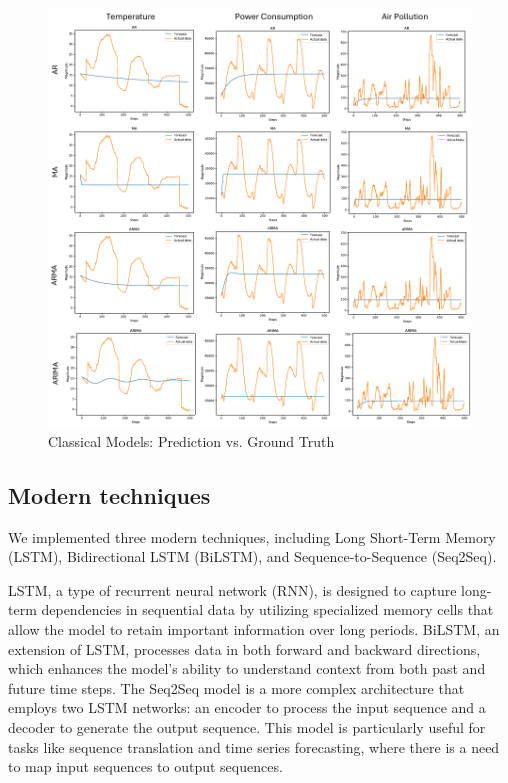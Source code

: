 \documentclass{scrartcl}
\begin{document}
\begin{figure}[]
	\begin{center}
		\includegraphics[scale=0.9]{Latex_report/fig/classical.pdf}
	\end{center}
	\caption{Classical Models: Prediction vs. Ground Truth}
	\label{fig:classical}
\end{figure}


\subsection{Modern techniques}
We implemented three modern techniques, including Long Short-Term Memory (LSTM), Bidirectional LSTM (BiLSTM), and Sequence-to-Sequence (Seq2Seq).


LSTM, a type of recurrent neural network (RNN), is designed to capture long-term dependencies in sequential data by utilizing specialized memory cells that allow the model to retain important information over long periods. BiLSTM, an extension of LSTM, processes data in both forward and backward directions, which enhances the model’s ability to understand context from both past and future time steps. The Seq2Seq model is a more complex architecture that employs two LSTM networks: an encoder to process the input sequence and a decoder to generate the output sequence. This model is particularly useful for tasks like sequence translation and time series forecasting, where there is a need to map input sequences to output sequences.
\end{document}
